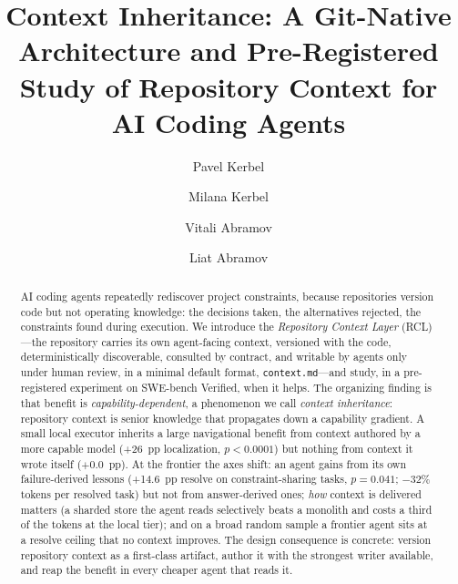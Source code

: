 \documentclass[sigconf,nonacm]{acmart}
\newcommand{\ctx}{\texttt{context.md}}
\begin{document}
\title{Context Inheritance: A Git-Native Architecture and Pre-Registered Study
of Repository Context for AI Coding Agents}

\author{Pavel Kerbel}
\author{Milana Kerbel}
\author{Vitali Abramov}
\author{Liat Abramov}

\begin{abstract}
AI coding agents repeatedly rediscover project constraints, because repositories
version code but not operating knowledge: the decisions taken, the alternatives
rejected, the constraints found during execution. We introduce the
\emph{Repository Context Layer} (RCL)---the repository carries its own agent-facing
context, versioned with the code, deterministically discoverable, consulted by
contract, and writable by agents only under human review, in a minimal default
format, \ctx{}---and study, in a pre-registered experiment on SWE-bench Verified,
when it helps. The organizing finding is that benefit is \emph{capability-dependent},
a phenomenon we call \emph{context inheritance}: repository context is senior
knowledge that propagates down a capability gradient. A small local executor
inherits a large navigational benefit from context authored by a more capable
model (+26~pp localization, $p < 0.0001$) but nothing from context it wrote itself
($+0.0$~pp). At the frontier the axes shift: an agent gains from its own
failure-derived lessons (+14.6~pp resolve on constraint-sharing tasks, $p = 0.041$;
$-32\%$ tokens per resolved task) but not from answer-derived ones; \emph{how}
context is delivered matters (a sharded store the agent reads selectively beats a
monolith and costs a third of the tokens at the local tier); and on a broad
random sample a frontier agent sits at a resolve ceiling that no context improves.
The design consequence is concrete: version repository context as a first-class
artifact, author it with the strongest writer available, and reap the benefit in
every cheaper agent that reads it.
\end{abstract}
\end{document}
